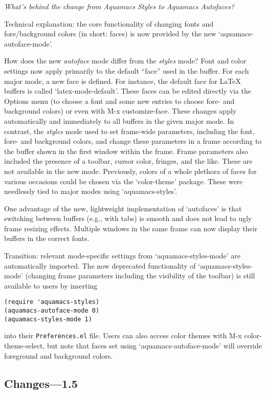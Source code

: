 \emph{What's behind the change from Aquamacs Styles to Aquamacs Autofaces?}
{\small
Technical explanation: the core functionality of changing fonts and fore/background colors (in short: faces) is now provided by the new `aquamacs-autoface-mode'.  

How does the new \emph{autoface} mode differ from the \emph{styles} mode?  Font and color settings now apply primarily to the default ``face'' used in the buffer.  For each major mode, a new face is defined.  For instance, the default face for LaTeX buffers is called `latex-mode-default'.  These faces can be edited directly via the Options menu (to choose a font and some new entries to choose fore- and background colors) or even with M-x customize-face.  These changes apply automatically and immediately to all buffers in the given major mode. In contrast, the \emph{styles} mode used to set frame-wide parameters, including the font, fore- and background colors, and change these parameters in a frame according to the buffer shown in the first window within the frame.  Frame parameters also included the presence of a toolbar, cursor color, fringes, and the like.  These are not available in the new mode.
Previously, colors of a whole plethora of faces for various occasions could be chosen via the `color-theme' package.  These were needlessly tied to major modes using `aquamacs-styles'. 

One advantage of the new, lightweight implementation of `autofaces' is that switching between buffers (e.g., with tabs) is smooth and does not lead to ugly frame resizing effects.  Multiple windows in the same frame can now display their buffers in the correct fonts.

Transition: relevant mode-specific settings from `aquamacs-styles-mode' are automatically imported.  The now deprecated functionality of `aquamacs-styles-mode' (changing frame parameters including the visibility of the toolbar) is still available to users by inserting
\begin{verbatim}
(require 'aquamacs-styles)
(aquamacs-autoface-mode 0)
(aquamacs-styles-mode 1)
\end{verbatim}
into their {\tt Preferences.el} file.  Users can also access color themes with M-x color-theme-select, but note that faces set using `aquamacs-autoface-mode' will override foreground and background colors.  }


\subsection{Changes---1.5}

